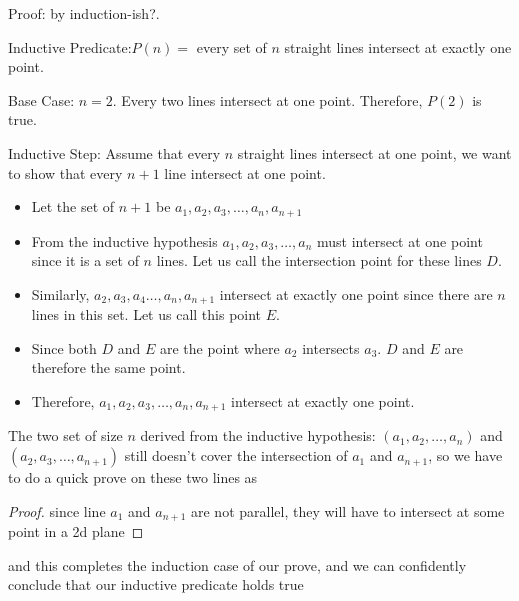 Proof: by induction-ish?.

\vspace{1em}

Inductive Predicate:$P (n) = $ every set of $n$ straight lines intersect
at exactly one point. 

\vspace{1em}

Base Case: $n = 2$. Every two lines intersect at one
point. Therefore, $P (2)$ is true. 

\vspace{1em}

Inductive Step: Assume that every $n$ straight lines intersect at one point, we want to show that every $n + 1$
line intersect at one point.

\vspace{1em}
\begin{itemize}
\item Let the set of $n + 1$ be ${a_1, a_2, a_3, \ldots , a_n, a_{n+1}}$
\item From the inductive hypothesis ${a_1, a_2, a_3, \ldots , a_n}$ must
intersect at one point since it is a set of $n$ lines. Let us call the
intersection point for these lines $D$.
\item Similarly, ${a_2, a_3, a_4 \ldots , a_n, a_{n+1}}$ intersect at
exactly one point since there are $n$ lines in this set. Let us call this
point $E$.
\item Since both $D$ and $E$ are the point where $a_2$ intersects $a_3$. $D$
and $E$ are therefore the same point.
\item Therefore, ${a_1, a_2, a_3, \ldots , a_n, a_{n+1}}$ intersect at
exactly one point.
\end{itemize}

\medskip
\solution

The two set of size $n$ derived from the inductive hypothesis: $(a_1, a_2,
\ldots, a_n)$ and $(a_2, a_3, \ldots, a_{n+1})$ still doesn't cover the
intersection of $a_1$ and $a_{n+1}$, so we have to do a quick prove on these
two lines as

\vspace{1em}

\begin{proof}
since line $a_1$ and $a_{n+1}$ are not parallel, they will have to intersect
at some point in a 2d plane
\end{proof}

and this completes the induction case of our prove, and we can confidently
conclude that our inductive predicate holds true

